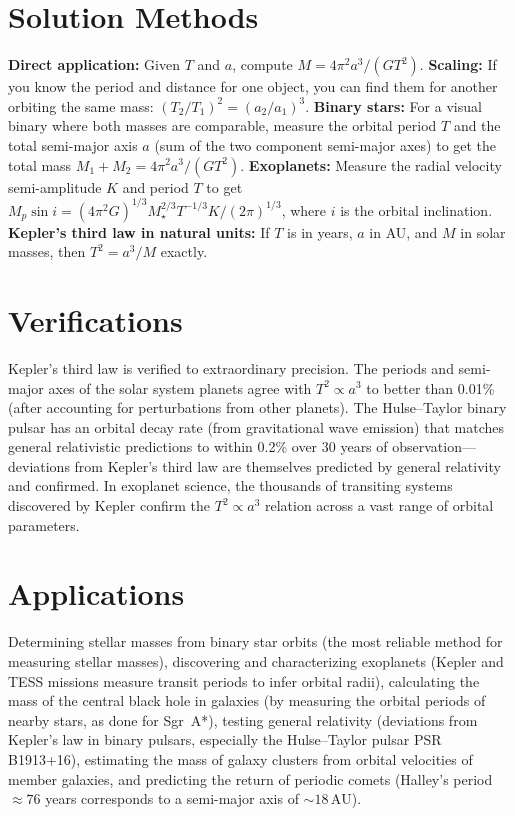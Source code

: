 \section*{Solution Methods}

\textbf{Direct application:} Given $T$ and $a$, compute $M = 4\pi^2 a^3/(GT^2)$. \textbf{Scaling:} If you know the period and distance for one object, you can find them for another orbiting the same mass: $(T_2/T_1)^2 = (a_2/a_1)^3$. \textbf{Binary stars:} For a visual binary where both masses are comparable, measure the orbital period $T$ and the total semi-major axis $a$ (sum of the two component semi-major axes) to get the total mass $M_1 + M_2 = 4\pi^2 a^3/(GT^2)$. \textbf{Exoplanets:} Measure the radial velocity semi-amplitude $K$ and period $T$ to get $M_p\sin i = (4\pi^2 G)^{1/3} M_\star^{2/3} T^{-1/3} K / (2\pi)^{1/3}$, where $i$ is the orbital inclination. \textbf{Kepler's third law in natural units:} If $T$ is in years, $a$ in AU, and $M$ in solar masses, then $T^2 = a^3/M$ exactly.
\section*{Verifications}

Kepler's third law is verified to extraordinary precision. The periods and semi-major axes of the solar system planets agree with $T^2 \propto a^3$ to better than 0.01\% (after accounting for perturbations from other planets). The Hulse--Taylor binary pulsar has an orbital decay rate (from gravitational wave emission) that matches general relativistic predictions to within 0.2\% over 30 years of observation---deviations from Kepler's third law are themselves predicted by general relativity and confirmed. In exoplanet science, the thousands of transiting systems discovered by Kepler confirm the $T^2 \propto a^3$ relation across a vast range of orbital parameters.
\section*{Applications}

Determining stellar masses from binary star orbits (the most reliable method for measuring stellar masses), discovering and characterizing exoplanets (Kepler and TESS missions measure transit periods to infer orbital radii), calculating the mass of the central black hole in galaxies (by measuring the orbital periods of nearby stars, as done for Sgr~A*), testing general relativity (deviations from Kepler's law in binary pulsars, especially the Hulse--Taylor pulsar PSR B1913+16), estimating the mass of galaxy clusters from orbital velocities of member galaxies, and predicting the return of periodic comets (Halley's period $\approx 76$ years corresponds to a semi-major axis of $\sim 18\,\text{AU}$).
